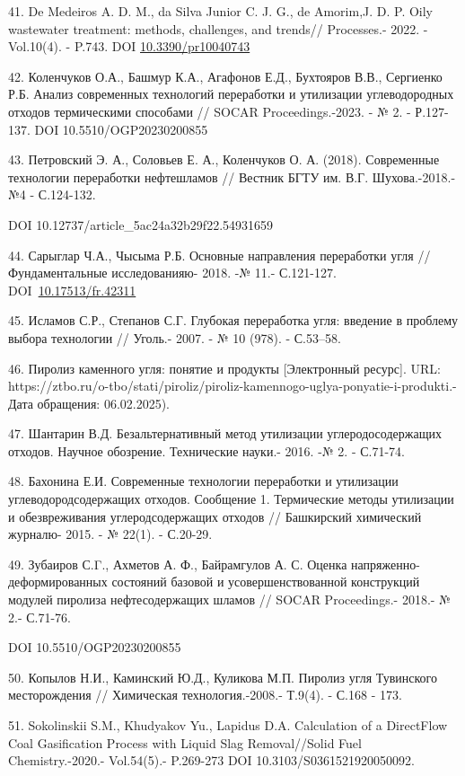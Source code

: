41. De Medeiros A. D. M., da Silva Junior C. J. G., de Amorim,J. D. P.
Oily wastewater treatment: methods, challenges, and trends// Processes.-
2022. - Vol.10(4). - P.743. DOI
\href{http://dx.doi.org/10.3390/pr10040743}{10.3390/pr10040743}

42. Коленчуков О.А., Башмур К.А., Агафонов Е.Д., Бухтояров В.В.,
Сергиенко Р.Б. Анализ современных технологий переработки и утилизации
углеводородных отходов термическими способами // SOCAR
Proceedings.-2023. - № 2. - Р.127-137. DOI 10.5510/OGP20230200855

43. Петровский Э. А., Соловьев Е. А., Коленчуков О. А. (2018).
Современные технологии переработки нефтешла­мов // Вестник БГТУ им. В.Г.
Шухова.-2018.- №4 - С.124-132.

DOI 10.12737/article\_5ac24a32b29f22.54931659

44. Сарыглар Ч.А., Чысыма Р.Б. Основные направления переработки угля //
Фундаментальные исследованияю- 2018. -№ 11.- С.121-127.
DOI~\href{https://doi.org/10.17513/fr.42311}{10.17513/fr.42311}

45. Исламов С.Р., Степанов С.Г. Глубокая переработка угля: введение в
проблему выбора технологии // Уголь.- 2007. - № 10 (978). - С.53--58.

46. Пиролиз каменного угля: понятие и продукты {[}Электронный ресурс{]}.
URL:
https://ztbo.ru/o-tbo/stati/piroliz/piroliz-kamennogo-uglya-ponyatie-i-produkti.-Дата
обращения: 06.02.2025).

47. Шантарин В.Д. Безальтернативный метод утилизации углеродосодержащих
отходов. Научное обо­зрение. Технические науки.- 2016. -№ 2. - С.71-74.

48. Бахонина Е.И. Современные технологии переработки и утилизации
углеводородсодержащих отходов. Сообщение 1. Термические методы
утилизации и обезвреживания углеродсодержащих отходов // Башкирский
хими­ческий журналю- 2015. - № 22(1). - С.20-29.

49. Зубаиров С.Γ., Ахметов А. Ф., Байрамгулов А. С. Оценка
напряженно-деформированных состояний базовой и усовершенствованной
конструкций модулей пиролиза нефтесодержащих шламов // SOCAR
Proceedings.- 2018.- № 2.- С.71-76.

DOI 10.5510/OGP20230200855

50. Копылов Н.И., Каминский Ю.Д., Куликова М.П. Пиролиз угля Тувинского
месторождения // Химическая технология.-2008.- Т.9(4). - С.168 - 173.

51. Sokolinskii S.M., Khudyakov Yu., Lapidus D.A. Calculation of a
DirectFlow Coal Gasification Process with Liquid Slag Removal//Solid
Fuel Chemistry.-2020.- Vol.54(5).- P.269-273 DOI
10.3103/S0361521920050092.

